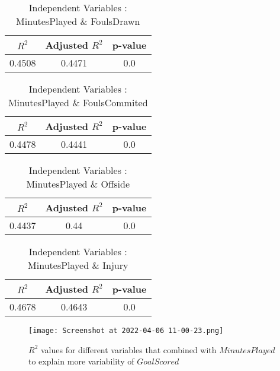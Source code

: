 \documentclass[12pt]{article}
\begin{document}
\hfill
\begin{minipage}{0.4\textwidth}
	\begin{table}[H]
		\centering
		\caption{Independent Variables : MinutesPlayed \& FoulsDrawn}\label{table:1a}
		{\begin{tabular}{|c|c|c|}
				\hline
				$ R^2 $ & Adjusted $ R^2 $ & p-value \\
				\hline
				0.4508 & 0.4471 & 0.0 \\
				\hline
			\end{tabular}
		}
	\end{table}
\end{minipage}
\hfill
\begin{minipage}{0.4\textwidth}
	\begin{table}[H]
		\centering
		\caption{Independent Variables : MinutesPlayed \& FoulsCommited}\label{table:1a}
		{\begin{tabular}{|c|c|c|}
				\hline
				$ R^2 $ & Adjusted $ R^2 $ & p-value \\
				\hline
				0.4478 & 0.4441 & 0.0 \\
				\hline
			\end{tabular}
		}
	\end{table}
\end{minipage}
\hfill
\begin{minipage}{0.4\textwidth}
	\begin{table}[H]
		\centering
		\caption{Independent Variables : MinutesPlayed \& Offside}\label{table:1a}
		{\begin{tabular}{|c|c|c|}
				\hline
				$ R^2 $ & Adjusted $ R^2 $ & p-value \\
				\hline
				0.4437 & 0.44 & 0.0 \\
				\hline
			\end{tabular}
		}
	\end{table}
\end{minipage}
	\begin{table}[H]
		\centering
		\caption{Independent Variables : MinutesPlayed \& Injury}\label{table:1a}
		{\begin{tabular}{|c|c|c|}
				\hline
				$ R^2 $ & Adjusted $ R^2 $ & p-value \\
				\hline
				0.4678 & 0.4643 & 0.0 \\
				\hline
			\end{tabular}
		}
	\end{table}

\begin{figure}[H]
	\centering
	\texttt{[image: Screenshot at 2022-04-06 11-00-23.png]}
	\caption{ $ R^2 $ values for different variables that combined with $ MinutesPlayed $ to explain more variability of $ GoalScored $}
	\label{fig:1}
	\label{var2GS}
\end{figure} 
\end{document}
